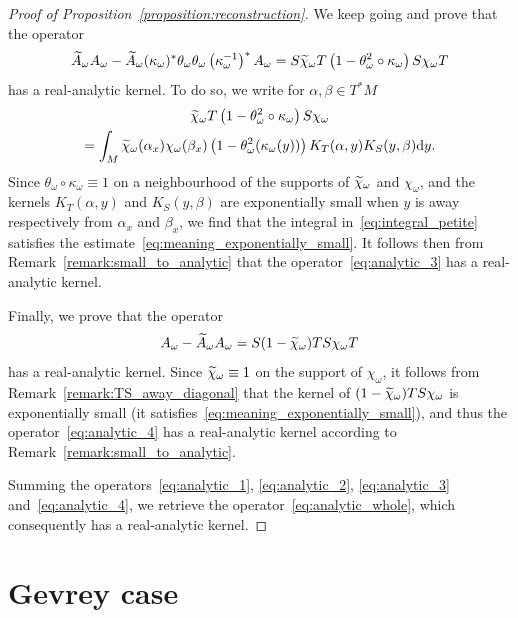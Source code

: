 \documentclass[10pt]{amsart}
\theoremstyle{definition}\newtheorem{defi}[theo]{Definition}\newtheorem{rema}[theo]{Remark}\newtheorem{exam}[theo]{Example}\newtheorem{exem}[theo]{Example}\newtheorem{nota}[theo]{Notation}
\newcommand{\rmd}{\mathrm{d}}
\let\oldtilde\tilde
\renewcommand*{\tilde}[1]{\mathchoice{\widetilde{#1}}{\widetilde{#1}}{\oldtilde{#1}}{\oldtilde{#1}}}
\begin{document}
\begin{proof}[Proof of Proposition~\ref{proposition:reconstruction}]
We keep going and prove that the operator
\begin{equation}\label{eq:analytic_3}
\widetilde{A}_\omega A_\omega - \widetilde{A}_\omega (\kappa_\omega)^* \theta_\omega \theta_\omega \left(\kappa_\omega^{-1}\right)^* A_\omega = S \tilde{\chi}_\omega T \left(1 - \theta_\omega^2 \circ \kappa_\omega\right) S \chi_\omega T
\end{equation}
has a real-analytic kernel. To do so, we write for $\alpha,\beta \in T^* M$
\begin{multline}\label{eq:integral_petite}
\tilde{\chi}_\omega T \left(1 - \theta_\omega^2 \circ \kappa_\omega\right) S \chi_\omega\\
= \int_{M} \tilde{\chi}_\omega(\alpha_x) \chi_{\omega}(\beta_x) \left(1 - \theta_\omega^2 (\kappa_\omega(y))\right) K_T(\alpha,y) K_S(y,\beta) \rmd y.
\end{multline}
Since $\theta_\omega \circ \kappa_\omega \equiv 1$ on a neighbourhood of the supports of $\tilde{\chi}_\omega$ and $\chi_\omega$, and the kernels $K_T(\alpha,y)$ and $K_S(y,\beta)$ are exponentially small when $y$ is away respectively from $\alpha_x$ and $\beta_x$, we find that the integral in~\eqref{eq:integral_petite} satisfies the estimate~\eqref{eq:meaning_exponentially_small}. It follows then from Remark~\ref{remark:small_to_analytic} that the operator~\eqref{eq:analytic_3} has a real-analytic kernel.

Finally, we prove that the operator
\begin{equation}\label{eq:analytic_4}
A_\omega - \widetilde{A}_\omega A_\omega = S (1 - \tilde{\chi}_\omega)TS\chi_\omega T
\end{equation}
has a real-analytic kernel. Since $\tilde{\chi}_\omega \equiv 1$ on the support of $\chi_\omega$, it follows from Remark~\ref{remark:TS_away_diagonal} that the kernel of $(1 - \tilde{\chi}_\omega)TS\chi_\omega$ is exponentially small (it satisfies~\eqref{eq:meaning_exponentially_small}), and thus the operator~\eqref{eq:analytic_4} has a real-analytic kernel according to Remark~\ref{remark:small_to_analytic}.

Summing the operators~\eqref{eq:analytic_1}, \eqref{eq:analytic_2}, \eqref{eq:analytic_3} and~\eqref{eq:analytic_4}, we retrieve the operator~\eqref{eq:analytic_whole}, which consequently has a real-analytic kernel.
\end{proof}

\section{Gevrey case}\label{section:Gevrey}
\end{document}
